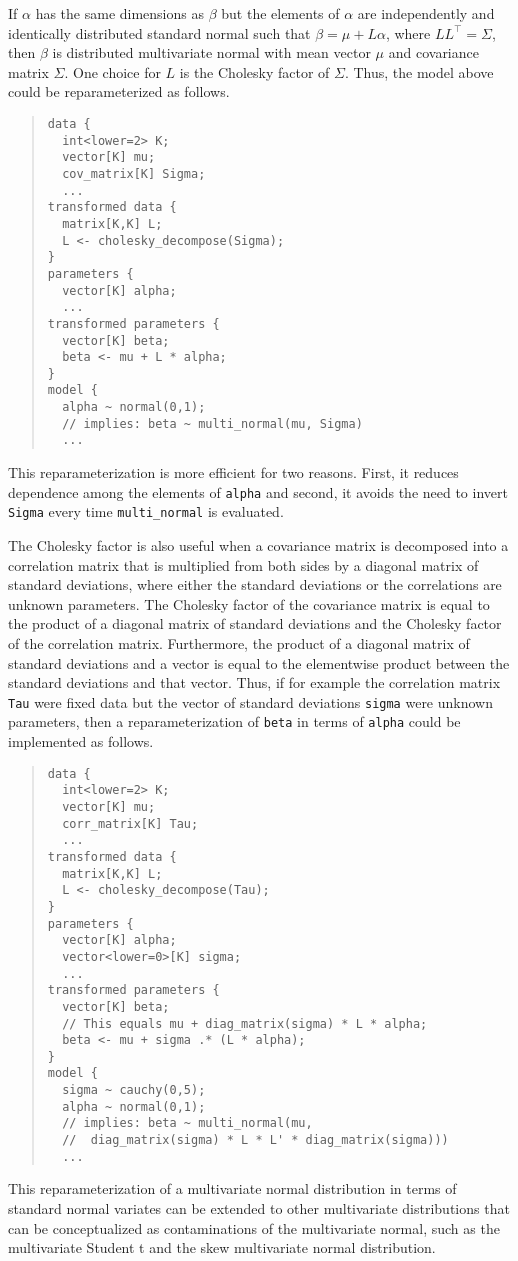 If $\alpha$ has the same dimensions as $\beta$ but the elements of 
$\alpha$ are independently and identically distributed standard normal 
such that $\beta = \mu + L\alpha$, where $LL^\top = \Sigma$, then 
$\beta$ is distributed multivariate normal with mean vector $\mu$ and 
covariance matrix $\Sigma$. One choice for $L$ is the Cholesky factor
of $\Sigma$. Thus, the model above could be reparameterized as follows.
%
\begin{quote}
\begin{Verbatim}[fontsize=\small]
data {
  int<lower=2> K;
  vector[K] mu;
  cov_matrix[K] Sigma;
  ...
transformed data {
  matrix[K,K] L;
  L <- cholesky_decompose(Sigma);
}
parameters {
  vector[K] alpha;
  ...
transformed parameters {
  vector[K] beta;
  beta <- mu + L * alpha; 
}
model {
  alpha ~ normal(0,1); 
  // implies: beta ~ multi_normal(mu, Sigma)
  ...
\end{Verbatim}
\end{quote}
%
This reparameterization is more efficient for two reasons. First, it
reduces dependence among the elements of \Verb|alpha| and second, it
avoids the need to invert \Verb|Sigma| every time \Verb|multi_normal|
is evaluated.

The Cholesky factor is also useful when a covariance matrix is 
decomposed into a correlation matrix that is multiplied from both
sides by a diagonal matrix of standard deviations, where either the
standard deviations or the correlations are unknown parameters. The
Cholesky factor of the covariance matrix is equal to the product of
a diagonal matrix of standard deviations and the Cholesky factor of
the correlation matrix. Furthermore, the product of a diagonal matrix
of standard deviations and a vector is equal to the elementwise
product between the standard deviations and that vector. Thus, if for
example the correlation matrix \Verb|Tau| were fixed data but the
vector of standard deviations \Verb|sigma| were unknown parameters,
then a reparameterization of \Verb|beta| in terms of \Verb|alpha|
could be implemented as follows.
%
\begin{quote}
\begin{Verbatim}[fontsize=\small]
data {
  int<lower=2> K;
  vector[K] mu;
  corr_matrix[K] Tau;
  ...
transformed data {
  matrix[K,K] L;
  L <- cholesky_decompose(Tau);
}
parameters {
  vector[K] alpha;
  vector<lower=0>[K] sigma;
  ...
transformed parameters {
  vector[K] beta;
  // This equals mu + diag_matrix(sigma) * L * alpha;
  beta <- mu + sigma .* (L * alpha);
}
model {
  sigma ~ cauchy(0,5);
  alpha ~ normal(0,1);
  // implies: beta ~ multi_normal(mu,
  //  diag_matrix(sigma) * L * L' * diag_matrix(sigma)))
  ...
\end{Verbatim}
\end{quote}
%
This reparameterization of a multivariate normal distribution in
terms of standard normal variates can be extended to other multivariate
distributions that can be conceptualized as contaminations of the 
multivariate normal, such as the multivariate Student t and the skew
multivariate normal distribution.

